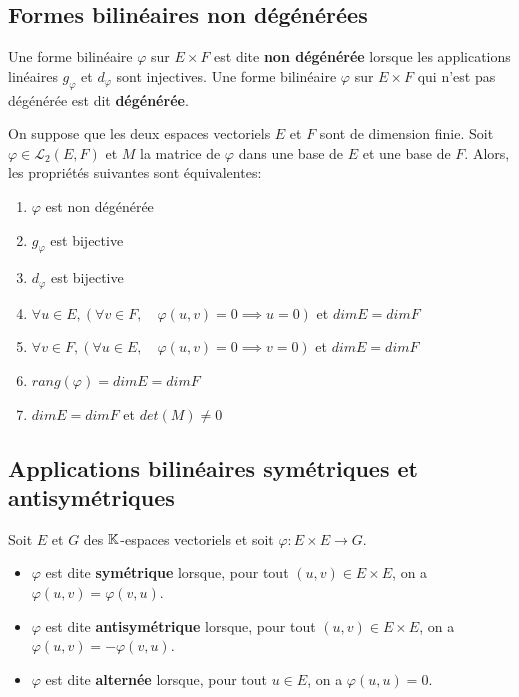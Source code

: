 \documentclass[a4paper,12pt]{article}
\begin{document}
\subsection{Formes bilinéaires non dégénérées}

\begin{definition}
    Une forme bilinéaire $\varphi$ sur $E \times F$ est dite \textbf{non dégénérée} lorsque les applications linéaires $g_\varphi$ et $d_\varphi$ sont injectives. Une forme bilinéaire $\varphi$ sur $E \times F$ qui n'est pas dégénérée est dit \textbf{dégénérée}.
\end{definition}

\begin{proposition}{}{}
    On suppose que les deux espaces vectoriels $E$ et $F$ sont de dimension finie.
    Soit $\varphi \in \mathcal{L}_2(E, F)$ et $M$ la matrice de $\varphi$ dans une base de $E$ et une base de $F$. Alors, les propriétés suivantes sont équivalentes:
    \begin{enumerate}
        \item $\varphi$ est non dégénérée
        \item $g_\varphi$ est bijective
        \item $d_\varphi$ est bijective
        \item $\forall u \in E, \left( \forall v \in F, \quad \varphi(u, v) = 0 \implies u = 0 \right)$ et $dim E = dim F$
        \item $\forall v \in F, \left( \forall u \in E, \quad \varphi(u, v) = 0 \implies v = 0 \right)$ et $dim E = dim F$
        \item $rang(\varphi) = dim E = dim F$
        \item $dim E = dim F$ et $det(M) \neq 0$
    \end{enumerate}
\end{proposition}

\subsection{Applications bilinéaires symétriques et antisymétriques}

\begin{definition}
    Soit $E$ et $G$ des $\mathbb{K}$-espaces vectoriels et soit $\varphi: E \times E \to G$.
    \begin{itemize}[label=--]
        \item $\varphi$ est dite \textbf{symétrique} lorsque, pour tout $(u, v) \in E \times E$, on a $\varphi(u, v) = \varphi(v, u)$.
        \item $\varphi$ est dite \textbf{antisymétrique} lorsque, pour tout $(u, v) \in E \times E$, on a $\varphi(u, v) = -\varphi(v, u)$.
        \item $\varphi$ est dite \textbf{alternée} lorsque, pour tout $u \in E$, on a $\varphi(u, u) = 0$.
    \end{itemize}
\end{definition}
\end{document}
